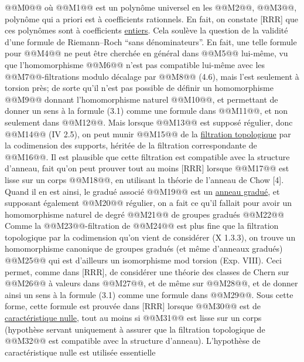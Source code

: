 
@@M0@@
où @@M1@@ est un polynôme universel en les @@M2@@, @@M3@@, polynôme qui a priori est à coefficients rationnels. En fait, on constate [RRR] que ces polynômes sont à coefficients \uline{entiers}. Cela soulève la question de la validité d'une formule de Riemann--Roch ``sans dénominateurs''. En fait, une telle formule pour @@M4@@ ne peut être cherchée en général dans @@M5@@ lui-même, vu que l'homomorphisme @@M6@@ n'est pas compatible lui-même avec les @@M7@@-filtrations modulo décalage par @@M8@@ (4.6), mais l'est seulement à torsion près; de sorte qu'il n'est pas possible de définir un homomorphisme @@M9@@ donnant l'homomorphisme naturel @@M10@@, et permettant de donner un sens à la formule (3.1) comme une formule dans @@M11@@, et non seulement dans @@M12@@. Mais lorsque @@M13@@ est supposé régulier, donc @@M14@@ (IV 2.5), on peut munir @@M15@@ de la \uline{filtration topologique} par la codimension des supports, héritée de la filtration correspondante de @@M16@@. Il est plausible que cette filtration est compatible avec la structure d'anneau, fait qu'on peut prouver tout au moins [RRR] lorsque @@M17@@ est lisse sur un corps @@M18@@, en utilisant la théorie de l'anneau de Chow [4]. Quand il en est ainsi, le gradué associé
@@M19@@
est un \uline{anneau gradué}, et supposant également @@M20@@ régulier, on a fait ce qu'il fallait pour avoir un homomorphisme naturel de degré @@M21@@ de groupes gradués
@@M22@@
Comme la @@M23@@-filtration de @@M24@@ est plus fine que la filtration topologique par la codimension qu'on vient de considérer (X 1.3.3), on trouve un homomorphisme canonique de groupes gradués (et même d'anneaux gradués)
@@M25@@
qui est d'ailleurs un isomorphisme mod torsion (Exp. VIII). Ceci permet, comme dans [RRR], de considérer une théorie des classes de Chern sur @@M26@@ à valeurs dans @@M27@@, et de même sur @@M28@@, et de donner ainsi un sens à la formule (3.1) comme une formule dans @@M29@@. Sous cette forme, cette formule est prouvée dans [RRR] lorsque @@M30@@ est de \uline{caractéristique nulle}, tout au moins si @@M31@@ est lisse sur un corps (hypothèse servant uniquement à assurer que la filtration topologique de @@M32@@ est compatible avec la structure d'anneau). L'hypothèse de caractéristique nulle est utilisée
essentielle%
